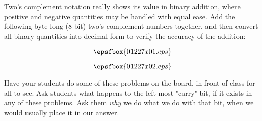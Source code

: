

Two's complement notation really shows its value in binary addition, where positive and negative quantities may be handled with equal ease.  Add the following byte-long (8 bit) two's complement numbers together, and then convert all binary quantities into decimal form to verify the accuracy of the addition:

\vskip 10pt

$$\epsfbox{01227x01.eps}$$

\vskip 10pt







$$\epsfbox{01227x02.eps}$$







Have your students do some of these problems on the board, in front of class for all to see.  Ask students what happens to the left-most "carry" bit, if it exists in any of these problems.  Ask them {\it why} we do what we do with that bit, when we would usually place it in our answer.





